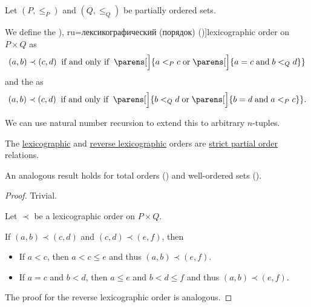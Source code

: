 \begin{definition}\label{def:lexicographic_order}\mimprovised
  Let \( (P, \leq_P) \) and \( (Q, \leq_Q) \) be partially ordered sets.

  We define the \term[en=lexicographic order (\cite[18]{DaveyPriestley2002LatticeTheory}), ru=лексикографический (порядок) (\cite[99]{Гуров2013ТеорияРешёток})]{lexicographic order} on \( P \times Q \) as
  \begin{equation}\label{eq:def:lexicographic_order}
    (a, b) \prec (c, d) \thickspace \T{if and only if} \thickspace \parens[\Big]{ a <_P c \T{or} \parens[\Big]{ a = c \T{and} b <_Q d } }
  \end{equation}
  and the  as
  \begin{equation}\label{eq:def:lexicographic_order/reverse}
    (a, b) \prec (c, d) \thickspace \T{if and only if} \thickspace \parens[\Big]{ b <_Q d \T{or} \parens[\Big]{ b = d \T{and} a <_P c } }.
  \end{equation}
\end{definition}
\begin{comments}
  \item We can use natural number recursion to extend this to arbitrary \( n \)-tuples.
\end{comments}

\begin{proposition}\label{thm:lexicographic_order_is_partial_order}
  The \hyperref[eq:def:lexicographic_order]{lexicographic} and \hyperref[eq:def:lexicographic_order/reverse]{reverse lexicographic} orders are \hyperref[def:partially_ordered_set]{strict partial order} relations.
\end{proposition}
\begin{comments}
  \item An analogous result holds for total orders () and well-ordered sets ().
\end{comments}
\begin{proof}
   Trivial.

   Let \( \prec \) be a lexicographic order on \( P \times Q \).

  If \( (a, b) \prec (c, d) \) and \( (c, d) \prec (e, f) \), then
  \begin{itemize}
    \item If \( a < c \), then \( a < c \leq e \) and thus \( (a, b) \prec (e, f) \).

    \item If \( a = c \) and \( b < d \), then \( a \leq e \) and \( b < d \leq f \) and thus \( (a, b) \prec (e, f) \).
  \end{itemize}

   The proof for the reverse lexicographic order is analogous.
\end{proof}

